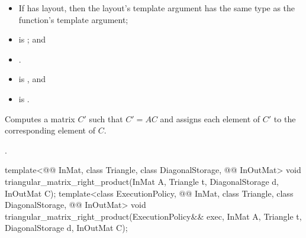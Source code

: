 \begin{itemdescr}
\pnum
\mandates
\begin{itemize}
\item
If  has  layout,
then the layout's  template argument has
the same type as the function's  template argument;
\item
{}
is ; and
\item
{}.
\end{itemize}

\pnum
\expects
\begin{itemize}
\item
{} is , and
\item
{} is .
\end{itemize}

\pnum
\effects
Computes a matrix $C'$ such that $C' = A C$ and
assigns each element of $C'$ to the corresponding element of $C$.

\pnum
\complexity
{}.
\end{itemdescr}

\begin{itemdecl}
template<@@ InMat, class Triangle, class DiagonalStorage, @@ InOutMat>
  void triangular_matrix_right_product(InMat A, Triangle t, DiagonalStorage d, InOutMat C);
template<class ExecutionPolicy,
         @@ InMat, class Triangle, class DiagonalStorage, @@ InOutMat>
  void triangular_matrix_right_product(ExecutionPolicy&& exec,
                                       InMat A, Triangle t, DiagonalStorage d, InOutMat C);
\end{itemdecl}

